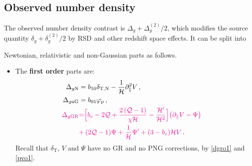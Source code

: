 {{{%
 
%
\subsection{{Observed number density}}\label{ss-ond}
%
The observed number density contrast is $\Delta_{g}+ \Delta_{g}^{(2)}/2$, which modifies the source  quantity $\delta_{g}+ \delta_{g}^{(2)}/2$ by RSD and other redshift space effects. It  can be split into {Newtonian, relativistic and non-Gaussian parts as follows. 
\begin{itemize}
\item
The {\bfseries first order} parts are:
\begin{align}
 \Delta_{g{\mathrm{N}}} &= b_{10}\delta_{{\mathrm{T,N}}} - \frac{1}{\mathcal{H}}  \partial_{\|}^2 V\,, \label{d1n} \\ 
 \Delta_{g\mathrm{nG}} &= b_{01} \varphi_{\mathrm{p}}\,,
 \label{eq:linearNewtonian}
\\
{\color{magenta}{\Delta_{g{\mathrm{GR}}}}} &{\color{magenta}{=}} {\color{magenta}{\Big[ b_e   - 2 \mathcal{Q}  + \frac{2\left( \mathcal{Q}-1 \right)}{\chi \mathcal{H}} - \frac{\mathcal{H}'}{\mathcal{H}^2} \Big]\big( \partial_{\|} V-  \Psi\big)}}
\notag\\
& {\color{magenta}{+\,(2 \mathcal{Q} -1)  \Psi   + \frac{1}{\mathcal{H}} \Psi' + (3- b_e )\mathcal{H}V}}\,.
\,\label{eq:linearGR}
\end{align}
Recall that $\delta_{\mathrm{T}}$, $V$ and $\Psi$ have no GR and no PNG corrections, by \eqref{dgro1} and \eqref{pvo1}.


\end{itemize}}}}}
